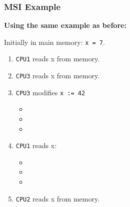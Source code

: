 \begin{frame}
  \frametitle{MSI Example}

  

  {\bf Using the same example as before:}

  Initially in main memory: {\tt x = 7}.

  \begin{enumerate}
    \item {\tt CPU1} reads x from memory. 
    \item {\tt CPU3} reads x from memory. 
    \item {\tt CPU3} modifies {\tt x := 42}
      \begin{itemize}
        \item {}
        \item {}
        \item {}
      \end{itemize}
    \item {\tt CPU1} reads x:
      \begin{itemize}
        \item {}
        \item {}
        \item {}
      \end{itemize}
    \item {\tt CPU2} reads x from memory. 
  \end{enumerate}
  
\end{frame}

